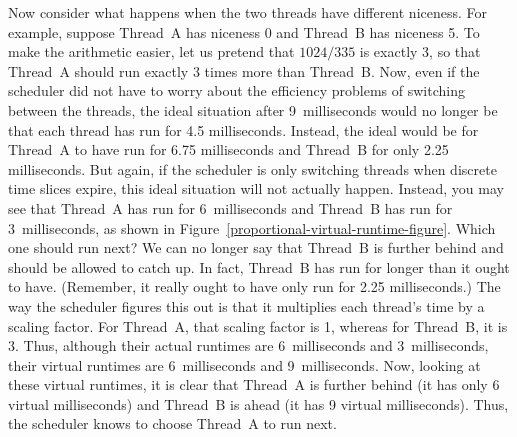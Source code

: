 Now consider what happens when the two threads have different niceness.  For
example, suppose Thread~A has niceness 0 and Thread~B has niceness 5.  To
make the arithmetic easier, let us pretend that $1024/335$ is exactly 3, so
that Thread~A should run exactly 3 times more than Thread~B.  Now, even if
the scheduler did not have to worry about the efficiency problems of
switching between the threads, the ideal situation after 9~milliseconds
would no longer be that each thread has run for 4.5 milliseconds.  Instead,
the ideal would be for Thread~A to have run for 6.75 milliseconds and Thread~B
for only 2.25 milliseconds.  But again, if the scheduler is only switching
threads when discrete time slices expire, this ideal situation will not actually
happen.  Instead, you may see that Thread~A has run for 6~milliseconds and
Thread~B has run for 3~milliseconds, as shown in Figure~\ref{proportional-virtual-runtime-figure}.  Which one should run next?  We can no
longer say that Thread~B is further behind and should be allowed to catch
up.  In fact, Thread~B has run for longer than it ought to have.  (Remember,
it really ought to have only run for 2.25 milliseconds.)  The way the
scheduler figures this out is that it multiplies each thread's time by a
scaling factor.  For Thread~A, that scaling factor is 1, whereas for Thread~B, it is 3.  Thus, although their actual runtimes are 6~milliseconds and
3~milliseconds, their virtual runtimes are 6~milliseconds and 9~milliseconds.  Now, looking at these virtual runtimes, it is clear that
Thread~A  is further behind (it has only 6 virtual milliseconds) and
Thread~B is ahead (it has 9 virtual milliseconds).  Thus, the
scheduler knows to choose Thread~A to run next.
